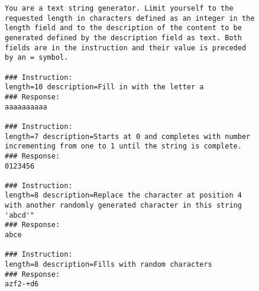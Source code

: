 
\begin{figure}[H]
    \centering
    \begin{verbatim}
You are a text string generator. Limit yourself to the requested length in characters defined as an integer in the length field and to the description of the content to be generated defined by the description field as text. Both fields are in the instruction and their value is preceded by an = symbol.

### Instruction:
length=10 description=Fill in with the letter a
### Response:
aaaaaaaaaa

### Instruction:
length=7 description=Starts at 0 and completes with number incrementing from one to 1 until the string is complete.
### Response:
0123456

### Instruction:
length=8 description=Replace the character at position 4 with another randomly generated character in this string 'abcd'"
### Response:
abce

### Instruction:
length=8 description=Fills with random characters
### Response:
azf2-+d6
    \end{verbatim}
    \label{lis:conf_alapaca.txt}
\end{figure}